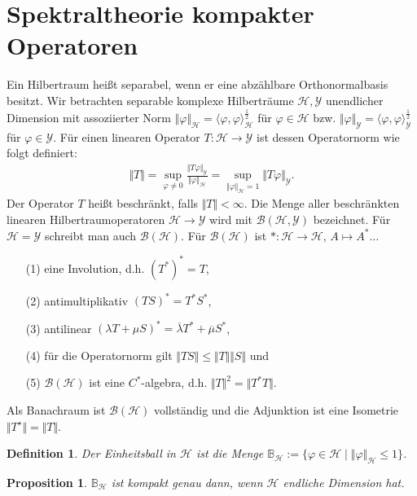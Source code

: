 \documentclass[11pt, hidelinks]{article}
\newcommand{\h}{\mathcal{H}}
\newcommand{\B}{\mathcal{B}}
\numberwithin{conj}{section}
\newtheorem{definition}[conj]{Definition}
\newtheorem{proposition}[conj]{Proposition}
\begin{document}
\section{Spektraltheorie kompakter Operatoren}
Ein Hilbertraum heißt separabel, wenn er eine abzählbare Orthonormalbasis besitzt. Wir betrachten separable komplexe Hilberträume $\h, \mathcal{Y}$ unendlicher Dimension mit assoziierter Norm $\Vert \varphi \Vert_{\h} = \langle \varphi, \varphi \rangle^{\frac{1}{2}}_{\h}$ für $\varphi \in \h$ bzw. $\Vert \varphi \Vert_{\mathcal{Y}} = \langle \varphi, \varphi \rangle^{\frac{1}{2}}_{\mathcal{Y}}$ für $\varphi \in \mathcal{Y}$. Für einen linearen Operator $T: \h \rightarrow \mathcal{Y}$ ist dessen Operatornorm wie folgt definiert:
\begin{align}
    \Vert T \Vert = \sup_{\varphi \neq 0} \frac{\Vert T\varphi \Vert_{\mathcal{Y}}}{\Vert\varphi\Vert_\h} = \sup_{\Vert\varphi\Vert_\h = 1} \Vert T\varphi\Vert_{\mathcal{Y}}.
\end{align}
Der Operator $T$ heißt beschränkt, falls $\Vert T \Vert < \infty$. Die Menge aller beschränkten linearen Hilbertraumoperatoren $\h \to \mathcal{Y}$ wird mit $\B(\h,\mathcal{Y})$ bezeichnet. Für $\h = \mathcal{Y}$ schreibt man auch $\B(\h)$. Für $\B(\h)$ ist $\ast: \h \to \h$, $A \mapsto A^\ast \ldots$
\begin{enumerate}
    \item[(1)] eine Involution, d.h. $(T^\ast)^\ast = T$,
    \item[(2)] antimultiplikativ $(TS)^\ast = T^\ast S^\ast$,
    \item[(3)] antilinear $(\lambda T + \mu S)^\ast = \overline{\lambda} T^\ast + \overline{\mu} S^\ast$,
    \item[(4)] für die Operatornorm gilt $\Vert TS  \Vert \leq \Vert T \Vert \Vert S \Vert$ und
    \item[(5)] $\B(\h)$ ist eine $C^\ast$-algebra, d.h. $\Vert T \Vert^2 = \Vert T^\ast T \Vert$.
\end{enumerate}
Als Banachraum ist $\B(\h)$ vollständig und die Adjunktion ist eine Isometrie $\Vert T^\star \Vert = \Vert T \Vert$.

\begin{definition}
    Der Einheitsball in $\h$ ist die Menge $\mathbb{B}_\h := \{ \varphi \in \h \; \vert \; \Vert \varphi \Vert_\h \leq 1 \}$.
\end{definition}

\begin{proposition}
    $\mathbb{B}_\h$ ist kompakt genau dann, wenn $\h$ endliche Dimension hat.
\end{proposition}
\end{document}
